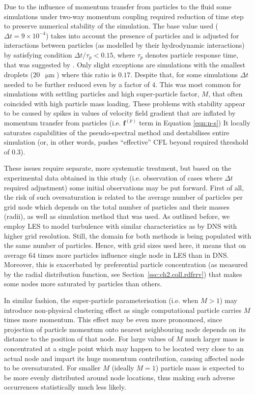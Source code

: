 \documentclass{pracamgren}
\begin{document}
Due to the influence of momentum transfer from particles to the fluid some simulations under two-way momentum coupling required reduction of time step to preserve numerical stability of the simulation.
The base value used ($\Delta t = 9 \times 10^{-4}$) takes into account the presence of particles \parencite{Zhou2001} and is adjusted for interactions between particles (as modelled by their hydrodynamic interactions) by satisfying condition $\Delta t / \tau_p < 0.15$, where $\tau_p$ denotes particle response time, that was suggested by \textcite{Ayala2007}.
Only slight exceptions are simulations with the smallest droplets ($20$~$\upmu\text{m}$) where this ratio is $0.17$. 
Despite that, for some simulations $\Delta t$ needed to be further reduced even by a factor of $4$.
This was most common for simulations with settling particles and high super-particle factor, $M$, that often coincided with high particle mass loading.
These problems with stability appear to be caused by spikes in values of velocity field gradient that are inflated by momentum transfer from particles (i.e. $\mathbf{f}^{(p)}$ term in Equation \ref{eqn:n-s})
It locally saturates capabilities of the pseudo-spectral method and destabilises entire simulation (or, in other words, pushes ``effective'' CFL beyond required threshold of $0.3$).

These issues require separate, more systematic treatment, but based on the experimental data obtained in this study (i.e. observation of cases where $\Delta t$ required adjustment) some initial observations may be put forward.
First of all, the risk of such oversaturation is related to the average number of particles per grid node which depends on the total number of particles and their masses (radii), as well as simulation method that was used.
As outlined before, we employ LES to model turbulence with similar characteristics as by DNS with higher grid resolution.
Still, the domain for both methods is being populated with the same number of particles.
Hence, with grid sizes used here, it means that on average $64$ times more particles influence single node in LES than in DNS.
Moreover, this is exacerbated by preferential particle concentration (as measured by the radial distribution function, see Section~\ref{ssc:ch2.coll.rdfrrv}) that makes some nodes more saturated by particles than others.

In similar fashion, the super-particle parameterisation (i.e. when $M > 1$) may introduce non-physical clustering effect as single computational particle carries $M$ times more momentum.
This effect may be even more pronounced, since projection of particle momentum onto nearest neighbouring node depends on its distance to the position of that node.
For large values of $M$ much larger mass is concentrated at a single point which may happen to be located very close to an actual node and impart its huge momentum contribution, causing affected node to be oversaturated.
For smaller $M$ (ideally $M=1$) particle mass is expected to be more evenly distributed around node locations, thus making such adverse occurrences statistically much less likely.
\end{document}

